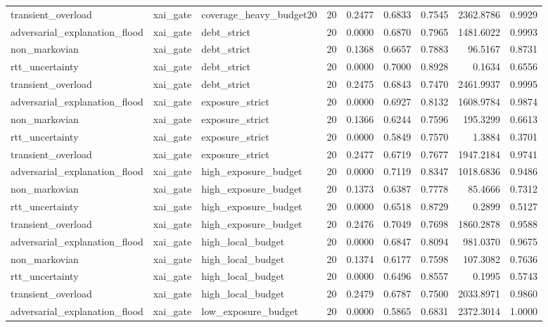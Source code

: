 \begin{table}[t]
\begin{tabular}{lllrrrrrr}
transient\_overload & xai\_gate & coverage\_heavy\_budget20 & 20 & 0.2477 & 0.6833 & 0.7545 & 2362.8786 & 0.9929 \\
adversarial\_explanation\_flood & xai\_gate & debt\_strict & 20 & 0.0000 & 0.6870 & 0.7965 & 1481.6022 & 0.9993 \\
non\_markovian & xai\_gate & debt\_strict & 20 & 0.1368 & 0.6657 & 0.7883 & 96.5167 & 0.8731 \\
rtt\_uncertainty & xai\_gate & debt\_strict & 20 & 0.0000 & 0.7000 & 0.8928 & 0.1634 & 0.6556 \\
transient\_overload & xai\_gate & debt\_strict & 20 & 0.2475 & 0.6843 & 0.7470 & 2461.9937 & 0.9995 \\
adversarial\_explanation\_flood & xai\_gate & exposure\_strict & 20 & 0.0000 & 0.6927 & 0.8132 & 1608.9784 & 0.9874 \\
non\_markovian & xai\_gate & exposure\_strict & 20 & 0.1366 & 0.6244 & 0.7596 & 195.3299 & 0.6613 \\
rtt\_uncertainty & xai\_gate & exposure\_strict & 20 & 0.0000 & 0.5849 & 0.7570 & 1.3884 & 0.3701 \\
transient\_overload & xai\_gate & exposure\_strict & 20 & 0.2477 & 0.6719 & 0.7677 & 1947.2184 & 0.9741 \\
adversarial\_explanation\_flood & xai\_gate & high\_exposure\_budget & 20 & 0.0000 & 0.7119 & 0.8347 & 1018.6836 & 0.9486 \\
non\_markovian & xai\_gate & high\_exposure\_budget & 20 & 0.1373 & 0.6387 & 0.7778 & 85.4666 & 0.7312 \\
rtt\_uncertainty & xai\_gate & high\_exposure\_budget & 20 & 0.0000 & 0.6518 & 0.8729 & 0.2899 & 0.5127 \\
transient\_overload & xai\_gate & high\_exposure\_budget & 20 & 0.2476 & 0.7049 & 0.7698 & 1860.2878 & 0.9588 \\
adversarial\_explanation\_flood & xai\_gate & high\_local\_budget & 20 & 0.0000 & 0.6847 & 0.8094 & 981.0370 & 0.9675 \\
non\_markovian & xai\_gate & high\_local\_budget & 20 & 0.1374 & 0.6177 & 0.7598 & 107.3082 & 0.7636 \\
rtt\_uncertainty & xai\_gate & high\_local\_budget & 20 & 0.0000 & 0.6496 & 0.8557 & 0.1995 & 0.5743 \\
transient\_overload & xai\_gate & high\_local\_budget & 20 & 0.2479 & 0.6787 & 0.7500 & 2033.8971 & 0.9860 \\
adversarial\_explanation\_flood & xai\_gate & low\_exposure\_budget & 20 & 0.0000 & 0.5865 & 0.6831 & 2372.3014 & 1.0000 \\

\end{tabular}
\end{table}

